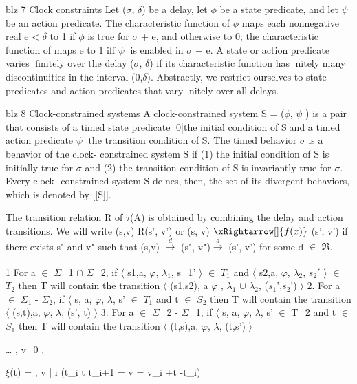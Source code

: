 blz 7 Clock constraints
Let ($\sigma$, $\delta$) be a delay, let $\phi$ be a state predicate, and let $\psi$  be an action
predicate. The characteristic function of $\phi$ maps each nonnegative real e < $\delta$ to
1 if $\phi$ is true for $\sigma$ + e, and otherwise to 0; the characteristic function of   maps
e to 1 iff $\psi$   is enabled in $\sigma$ + e. A state or action predicate varies finitely over the
delay ($\sigma$, $\delta$) if its characteristic function has nitely many discontinuities in the
interval (0,$\delta$). Abstractly, we restrict ourselves to state predicates and action
predicates that vary nitely over all delays.


blz 8 Clock-constrained systems
A clock-constrained system S = ($\phi$, $\psi$ ) is a pair that consists of a timed state
predicate 0|the initial condition of S|and a timed action predicate $\psi$ |the
transition condition of S. The timed behavior $\sigma$ is a behavior of the clock-
constrained system S if (1) the initial condition of S is initially true for $\sigma$
and (2) the transition condition of S is invariantly true for $\sigma$. Every clock-
constrained system S denes, then, the set of its divergent behaviors, which is
denoted by [[S]].


The transition relation R of $\tau$(A) is obtained by combining the delay and action transitions. We will write (s,v) R(s', v') or (s, v) $\xRightarrow[]{f(x)}$   (s', v') if there exists s" and v" such that (s,v) $\xrightarrow[]{d}$ (s", v")$\xrightarrow[]{a}$ (s', v') for some d $\in$ $\Re$.


1 For a $\in$ $\Sigma$_1 $\cap$ $\Sigma$_2, if $\langle$ s1,a, $\varphi$, $\lambda_1$, s_1' $\rangle$ $\in$ $T_1$ and $\langle$ s2,a, $\varphi$, $\lambda_2$, $s_2'$ $\rangle$ $\in$ $T_2$ then T will contain the transition $\langle$ (s1,s2), a $\varphi$ , $\lambda_1$ $\cup$ $\lambda_2$, ($s_1$',$s_2$') $\rangle$
2. For a $\in$ $\Sigma_1$ - $\Sigma_2$, if $\langle$ s, a, $\varphi$, $\lambda$, s' $\in$ $T_1$ and t $\in$ $S_2$ then T will contain the transition $\langle$ (s,t),a, $\varphi$, $\lambda$, (s', t) $\rangle$
3. For a $\in$ $\Sigma$_2 - $\Sigma$_1, if $\langle$ s, a, $\varphi$, $\lambda$, s' $\in$ T_2 and t $\in$ $S_1$ then T will contain the transition $\langle$ (t,s),a, $\varphi$, $\lambda$, (t,s') $\rangle$


\xi \dots \langle {}  , v_0  \rangle ,

$\xi$(t) = {\langle {}  , v  \rangle | \exists i \in   {} \bullet (t_i \leq 
	t \leq t_{i+1} \wedge \overleftarrow{ $\ell$}  =   \wedge v = v_i +t -t_i) }



